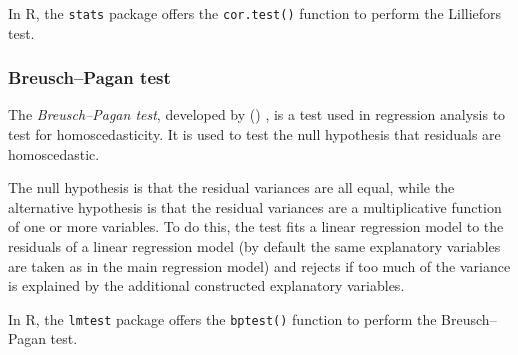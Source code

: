\medskip
In R, the \texttt{stats} package offers the \texttt{cor.test()} function to perform the Lilliefors test.

\subsubsection{Breusch--Pagan test}\label{sec:diag-bptest}
The \emph{Breusch--Pagan test}, developed by \citeauthor{Breusch1979} (\citeyear{Breusch1979}) \cite{Breusch1979}, is a test used in regression analysis to test for homoscedasticity. It is used to test the null hypothesis that residuals are homoscedastic.

The null hypothesis is that the residual variances are all equal, while the alternative hypothesis is that the residual variances are a multiplicative function of one or more variables. To do this, the test fits a linear regression model to the residuals of a linear regression model (by default the same explanatory variables are taken as in the main regression model) and rejects if too much of the variance is explained by the additional constructed explanatory variables.

\medskip
In R, the \texttt{lmtest} package offers the \texttt{bptest()} function to perform the Breusch--Pagan test.




